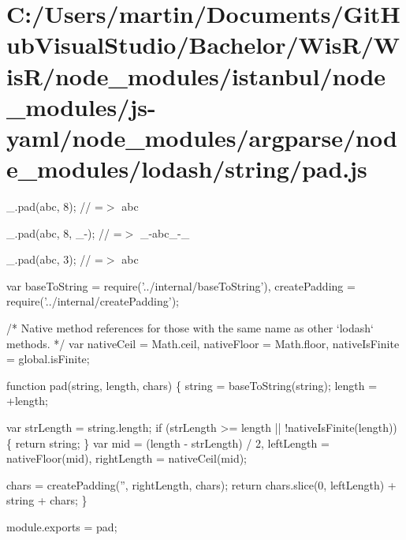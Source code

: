 \hypertarget{_c_1_2_users_2martin_2_documents_2_git_hub_visual_studio_2_bachelor_2_wis_r_2_wis_r_2node_module68d77ac3a1b995dacbc4dfd117bc1ecb}{}\section{C\+:/\+Users/martin/\+Documents/\+Git\+Hub\+Visual\+Studio/\+Bachelor/\+Wis\+R/\+Wis\+R/node\+\_\+modules/istanbul/node\+\_\+modules/js-\/yaml/node\+\_\+modules/argparse/node\+\_\+modules/lodash/string/pad.\+js}
\+\_\+.\+pad(\textquotesingle{}abc\textquotesingle{}, 8); // =$>$ \textquotesingle{} abc \textquotesingle{}

\+\_\+.\+pad(\textquotesingle{}abc\textquotesingle{}, 8, \textquotesingle{}\+\_\+-\/\textquotesingle{}); // =$>$ \textquotesingle{}\+\_\+-\/abc\+\_\+-\/\+\_\+\textquotesingle{}

\+\_\+.\+pad(\textquotesingle{}abc\textquotesingle{}, 3); // =$>$ \textquotesingle{}abc\textquotesingle{}


\begin{DoxyCodeInclude}
var baseToString = require(\textcolor{stringliteral}{'../internal/baseToString'}),
    createPadding = require(\textcolor{stringliteral}{'../internal/createPadding'});

\textcolor{comment}{/* Native method references for those with the same name as other `lodash` methods. */}
var nativeCeil = Math.ceil,
    nativeFloor = Math.floor,
    nativeIsFinite = global.isFinite;

\textcolor{keyword}{function} pad(\textcolor{keywordtype}{string}, length, chars) \{
  \textcolor{keywordtype}{string} = baseToString(\textcolor{keywordtype}{string});
  length = +length;

  var strLength = \textcolor{keywordtype}{string}.length;
  \textcolor{keywordflow}{if} (strLength >= length || !nativeIsFinite(length)) \{
    \textcolor{keywordflow}{return} string;
  \}
  var mid = (length - strLength) / 2,
      leftLength = nativeFloor(mid),
      rightLength = nativeCeil(mid);

  chars = createPadding(\textcolor{stringliteral}{''}, rightLength, chars);
  \textcolor{keywordflow}{return} chars.slice(0, leftLength) + \textcolor{keywordtype}{string} + chars;
\}

module.exports = pad;
\end{DoxyCodeInclude}
 
